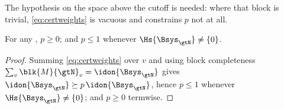 
The hypothesis on the space above the cutoff is needed: where that block is
trivial, \eqref{eq:certweights} is vacuous and constrains $p$ not at all.

\begin{lemma}\label{lem:ple1}
For any , $p\ge0$; and $p\le1$ whenever
$\Hs{\Bsys_{\gtN}}\ne\{0\}$.
\end{lemma}

\begin{proof}
Summing \eqref{eq:certweights} over $v$ and using block completeness
$\sum_v\blk{M}{\gtN}_v=\idon{\Bsys_{\gtN}}$ gives
$\idon{\Bsys_{\gtN}}\succeq p\,\idon{\Bsys_{\gtN}}$, hence $p\le1$ whenever
$\Hs{\Bsys_{\gtN}}\ne\{0\}$; and $p\ge0$ termwise.
\end{proof}
